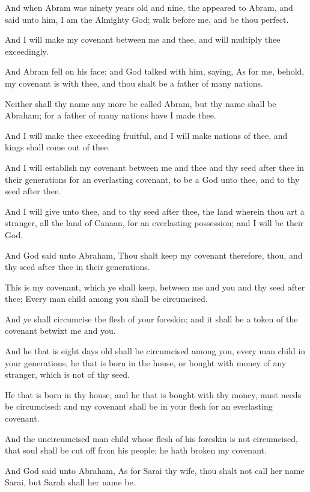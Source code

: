 \verse And when Abram was ninety years old and nine, the \LORD appeared to Abram, and said unto him, I am the Almighty God; walk before me, and be thou perfect.

\verse And I will make my covenant between me and thee, and will multiply thee exceedingly.

\verse And Abram fell on his face: and God talked with him, saying, \verse As for me, behold, my covenant is with thee, and thou shalt be a father of many nations.

\verse Neither shall thy name any more be called Abram, but thy name shall be Abraham; for a father of many nations have I made thee.

\verse And I will make thee exceeding fruitful, and I will make nations of thee, and kings shall come out of thee.

\verse And I will establish my covenant between me and thee and thy seed after thee in their generations for an everlasting covenant, to be a God unto thee, and to thy seed after thee.

\verse And I will give unto thee, and to thy seed after thee, the land wherein thou art a stranger, all the land of Canaan, for an everlasting possession; and I will be their God.

\verse And God said unto Abraham, Thou shalt keep my covenant therefore, thou, and thy seed after thee in their generations.

\verse This is my covenant, which ye shall keep, between me and you and thy seed after thee; Every man child among you shall be circumcised.

\verse And ye shall circumcise the flesh of your foreskin; and it shall be a token of the covenant betwixt me and you.

\verse And he that is eight days old shall be circumcised among you, every man child in your generations, he that is born in the house, or bought with money of any stranger, which is not of thy seed.

\verse He that is born in thy house, and he that is bought with thy money, must needs be circumcised: and my covenant shall be in your flesh for an everlasting covenant.

\verse And the uncircumcised man child whose flesh of his foreskin is not circumcised, that soul shall be cut off from his people; he hath broken my covenant.

\verse And God said unto Abraham, As for Sarai thy wife, thou shalt not call her name Sarai, but Sarah shall her name be.

